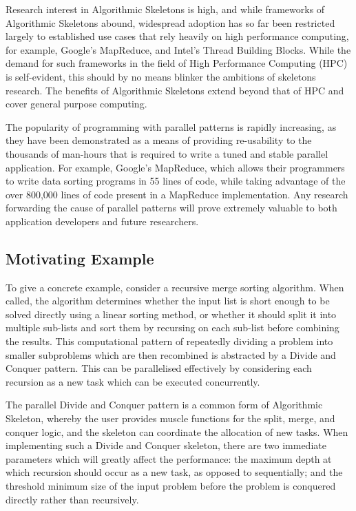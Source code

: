 Research interest in Algorithmic Skeletons is high, and while
frameworks of Algorithmic Skeletons abound, widespread adoption has so
far been restricted largely to established use cases that rely heavily
on high performance computing, for example, Google's MapReduce, and
Intel's Thread Building Blocks. While the demand for such frameworks
in the field of High Performance Computing (HPC) is self-evident, this
should by no means blinker the ambitions of skeletons research. The
benefits of Algorithmic Skeletons extend beyond that of HPC and cover
general purpose computing.

The popularity of programming with parallel patterns is rapidly
increasing, as they have been demonstrated as a means of providing
re-usability to the thousands of man-hours that is required to write a
tuned and stable parallel application. For example, Google's
MapReduce, which allows their programmers to write data sorting
programs in 55 lines of code, while taking advantage of the over
800,000 lines of code present in a MapReduce implementation. Any
research forwarding the cause of parallel patterns will prove
extremely valuable to both application developers and future
researchers.

\subsection{Motivating Example}

To give a concrete example, consider a recursive merge sorting
algorithm. When called, the algorithm determines whether the input
list is short enough to be solved directly using a linear sorting
method, or whether it should split it into multiple sub-lists and sort
them by recursing on each sub-list before combining the results. This
computational pattern of repeatedly dividing a problem into smaller
subproblems which are then recombined is abstracted by a Divide and
Conquer pattern. This can be parallelised effectively by considering
each recursion as a new task which can be executed concurrently.

The parallel Divide and Conquer pattern is a common form of
Algorithmic Skeleton, whereby the user provides muscle functions for
the split, merge, and conquer logic, and the skeleton can coordinate
the allocation of new tasks. When implementing such a Divide and
Conquer skeleton, there are two immediate parameters which will
greatly affect the performance: the maximum depth at which recursion
should occur as a new task, as opposed to sequentially; and the
threshold minimum size of the input problem before the problem is
conquered directly rather than recursively.

